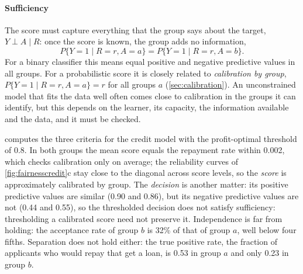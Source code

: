 \paragraph{Sufficiency} The score must capture everything that the group says about the target,
$Y\perp A\mid R$: once the score is known, the group adds no information,
\begin{equation}
  P\{Y=1\mid R=r,A=a\}=P\{Y=1\mid R=r,A=b\}.
\end{equation}
For a binary classifier this means equal positive and negative predictive values in all groups.
For a probabilistic score it is closely related to \emph{calibration by group},
$P\{Y=1\mid R=r,A=a\}=r$ for all groups $a$ (\cref{sec:calibration}). An unconstrained model that fits the data
well often comes close to calibration in the groups it can identify, but this depends on the learner,
its capacity, the information available and the data, and it must be checked.

 computes the three criteria for the credit model with the profit-optimal
threshold of 0.8. In both groups the mean score equals the repayment rate within 0.002, which checks calibration
only on average; the reliability curves of \cref{fig:fairnesscredit}c stay close to the diagonal across
score levels, so the \emph{score} is approximately calibrated by group. The \emph{decision} is another
matter: its positive predictive values are similar (0.90 and 0.86), but its negative predictive values
are not (0.44 and 0.55), so the thresholded decision does not satisfy sufficiency: thresholding a
calibrated score need not preserve it. Independence is far from holding: the acceptance rate of group $b$ is 32\% of that of
group $a$, well below four fifths. Separation does not hold either: the true positive rate, the
fraction of applicants who would repay that get a loan, is 0.53 in group $a$ and only 0.23 in
group $b$.

